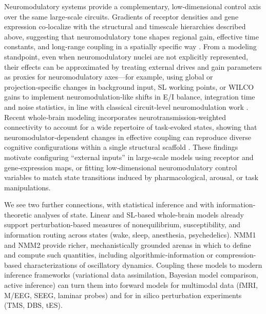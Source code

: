 \documentclass[12pt]{article}
\numberwithin{equation}{section}
\newcommand{\rev}[1]{\begingroup\color{navyblue}#1\endgroup}
\begin{document}
Neuromodulatory systems provide a complementary, low‑dimensional control axis over the same large‑scale circuits. Gradients of receptor densities and gene expression co‑localize with the structural and timescale hierarchies described above, suggesting that neuromodulatory tone shapes regional gain, effective time constants, and long‑range coupling in a spatially specific way \cite{demirtasHierarchicalHeterogeneityHuman2019,burtHierarchyTranscriptomicSpecialization2018}. From a modeling standpoint, even when neuromodulatory nuclei are not explicitly represented, their effects can be approximated by treating external drives and gain parameters as proxies for neuromodulatory axes—for example, using global or projection‑specific changes in background input, SL working points, or WILCO gains to implement neuromodulation‑like shifts in E/I balance, integration time and noise statistics, in line with classical circuit‑level neuromodulation work \cite{marderNeuromodulationNeuronalCircuits2012}. Recent whole‑brain modeling incorporates neurotransmission‑weighted connectivity to account for a wide repertoire of task‑evoked states, showing that neuromodulator‑dependent changes in effective coupling can reproduce diverse cognitive configurations within a single structural scaffold  \cite{decoEvolutionsBoldestTrick2025}. These findings motivate configuring “external inputs” in large‑scale models using receptor and gene‑expression maps, or fitting low‑dimensional neuromodulatory control variables to match state transitions induced by pharmacological, arousal, or task manipulations.

\rev{We see two further connections, with statistical inference and with information-theoretic analyses of state.} Linear and SL-based whole-brain models already support perturbation-based measures of nonequilibrium, susceptibility, and information routing across states (wake, sleep, anesthesia, psychedelics).\cite{decoTurbulentlikeDynamicsHuman2020,Escrichs2022Turbulence,cruzatEffectsClassicPsychedelic2022} NMM1 and NMM2 provide richer, mechanistically grounded arenas in which to define and compute such quantities, including algorithmic-information or compression-based characterizations of oscillatory dynamics. Coupling these models to modern inference frameworks (variational data assimilation, Bayesian model comparison, active inference) can turn them into forward models for multimodal data (fMRI, M/EEG, SEEG, laminar probes) and for in silico perturbation experiments (TMS, DBS, tES).\cite{breakspearDynamicModelsLargescale2017,Sadeghi2020,duchetHowDesignOptimal2024,ruffiniAlgorithmicAgentPerspective2024} 
\end{document}
